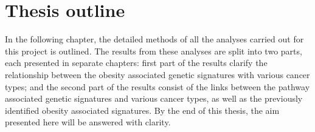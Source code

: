 \section{Thesis outline}
\label{sec:thesis_outline}

In the following chapter, the detailed methods of all the analyses carried out for this project is outlined.
The results from these analyses are split into two parts, each presented in separate chapters: first part of the results clarify the relationship between the obesity associated genetic signatures with various cancer types; and the second part of the results consist of the links between the pathway associated genetic signatures and various cancer types, as well as the previously identified obesity associated signatures.
By the end of this thesis, the aim presented here will be answered with clarity.

